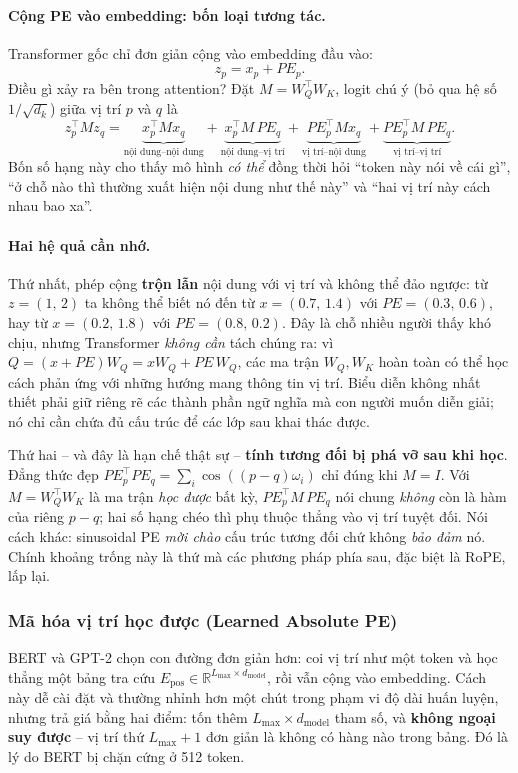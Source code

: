 \paragraph{Cộng PE vào embedding: bốn loại tương tác.} Transformer gốc chỉ đơn giản cộng vào embedding đầu vào:
\[
z_p = x_p + PE_p .
\]
Điều gì xảy ra bên trong attention? Đặt $M = W_Q^\top W_K$, logit chú ý (bỏ qua hệ số $1/\sqrt{d_k}$) giữa vị trí $p$ và $q$ là
\[
z_p^\top M z_q = \underbrace{x_p^\top M x_q}_{\text{nội dung--nội dung}} + \underbrace{x_p^\top M \, PE_q}_{\text{nội dung--vị trí}} + \underbrace{PE_p^\top M x_q}_{\text{vị trí--nội dung}} + \underbrace{PE_p^\top M \, PE_q}_{\text{vị trí--vị trí}} .
\]
Bốn số hạng này cho thấy mô hình \emph{có thể} đồng thời hỏi “token này nói về cái gì”, “ở chỗ nào thì thường xuất hiện nội dung như thế này” và “hai vị trí này cách nhau bao xa”.

\paragraph{Hai hệ quả cần nhớ.} Thứ nhất, phép cộng \textbf{trộn lẫn} nội dung với vị trí và không thể đảo ngược: từ $z = (1,\, 2)$ ta không thể biết nó đến từ $x = (0.7,\, 1.4)$ với $PE = (0.3,\, 0.6)$, hay từ $x = (0.2,\, 1.8)$ với $PE = (0.8,\, 0.2)$. Đây là chỗ nhiều người thấy khó chịu, nhưng Transformer \emph{không cần} tách chúng ra: vì $Q = (x + PE)W_Q = xW_Q + PE\,W_Q$, các ma trận $W_Q, W_K$ hoàn toàn có thể học cách phản ứng với những hướng mang thông tin vị trí. Biểu diễn không nhất thiết phải giữ riêng rẽ các thành phần ngữ nghĩa mà con người muốn diễn giải; nó chỉ cần chứa đủ cấu trúc để các lớp sau khai thác được.

Thứ hai -- và đây là hạn chế thật sự -- \textbf{tính tương đối bị phá vỡ sau khi học}. Đẳng thức đẹp $PE_p^\top PE_q = \sum_i \cos((p-q)\omega_i)$ chỉ đúng khi $M = I$. Với $M = W_Q^\top W_K$ là ma trận \emph{học được} bất kỳ, $PE_p^\top M\, PE_q$ nói chung \emph{không} còn là hàm của riêng $p-q$; hai số hạng chéo thì phụ thuộc thẳng vào vị trí tuyệt đối. Nói cách khác: sinusoidal PE \emph{mời chào} cấu trúc tương đối chứ không \emph{bảo đảm} nó. Chính khoảng trống này là thứ mà các phương pháp phía sau, đặc biệt là RoPE, lấp lại.

\subsubsection{Mã hóa vị trí học được (Learned Absolute PE)}
BERT \cite{devlin2018bert} và GPT-2 \cite{radford2019language} chọn con đường đơn giản hơn: coi vị trí như một token và học thẳng một bảng tra cứu $E_{\text{pos}} \in \mathbb{R}^{L_{\max} \times d_{\text{model}}}$, rồi vẫn cộng vào embedding. Cách này dễ cài đặt và thường nhỉnh hơn một chút trong phạm vi độ dài huấn luyện, nhưng trả giá bằng hai điểm: tốn thêm $L_{\max} \times d_{\text{model}}$ tham số, và \textbf{không ngoại suy được} -- vị trí thứ $L_{\max}+1$ đơn giản là không có hàng nào trong bảng. Đó là lý do BERT bị chặn cứng ở 512 token.

